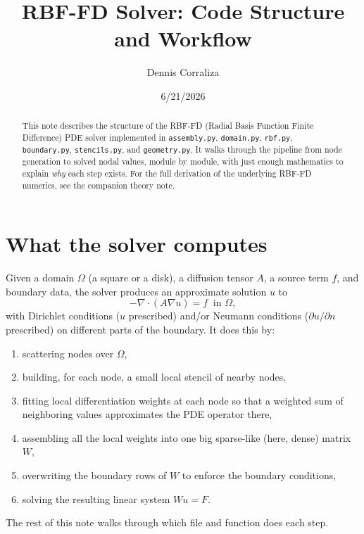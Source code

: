 \documentclass[11pt]{article}
\title{RBF-FD Solver: Code Structure and Workflow}
\author{Dennis Corraliza}
\date{6/21/2026}
\newcommand{\diver}{\nabla\!\cdot}
\newcommand{\grad}{\nabla}
\begin{document}
\maketitle

\begin{abstract}
This note describes the structure of the RBF-FD (Radial Basis
Function Finite Difference) PDE solver implemented in
\texttt{assembly.py}, \texttt{domain.py}, \texttt{rbf.py},
\texttt{boundary.py}, \texttt{stencils.py}, and \texttt{geometry.py}.
It walks through the pipeline from node generation to solved nodal
values, module by module, with just enough mathematics to explain
\emph{why} each step exists. For the full derivation of the underlying
RBF-FD numerics, see the companion theory note.
\end{abstract}

\tableofcontents

\section{What the solver computes}

Given a domain $\Omega$ (a square or a disk), a diffusion tensor $A$,
a source term $f$, and boundary data, the solver produces an
approximate solution $u$ to
\[
  -\diver(A\grad u) = f \ \text{ in } \Omega,
\]
with Dirichlet conditions ($u$ prescribed) and/or Neumann conditions
($\partial u/\partial n$ prescribed) on different parts of the
boundary. It does this by:
\begin{enumerate}[leftmargin=2em]
  \item scattering nodes over $\Omega$,
  \item building, for each node, a small local stencil of nearby nodes,
  \item fitting local differentiation weights at each node so that a
        weighted sum of neighboring values approximates the PDE
        operator there,
  \item assembling all the local weights into one big sparse-like
        (here, dense) matrix $W$,
  \item overwriting the boundary rows of $W$ to enforce the boundary
        conditions,
  \item solving the resulting linear system $Wu = F$.
\end{enumerate}
The rest of this note walks through which file and function does each
step.
\end{document}
